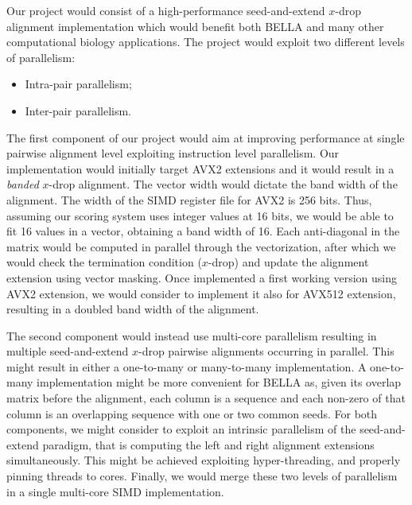 \justify

Our project would consist of a high-performance seed-and-extend $x$-drop alignment implementation which would benefit both BELLA and many other computational biology applications.
The project would exploit two different levels of parallelism:
\begin{itemize}
	\item Intra-pair parallelism;
	\item Inter-pair parallelism.
\end{itemize}

The first component of our project would aim at improving performance at single pairwise alignment level exploiting instruction level parallelism. 	
Our implementation would initially target AVX2 extensions and it would result in a \textit{banded} $x$-drop alignment.
The vector width would dictate the band width of the alignment.
The width of the SIMD register file for AVX2 is 256 bits.
Thus, assuming our scoring system uses integer values at 16 bits, we would be able to fit 16 values in a vector, obtaining a band width of 16. 
Each anti-diagonal in the matrix would be computed in parallel through the vectorization, after which we would check the termination condition ($x$-drop) and update the alignment extension using vector masking. 	
Once implemented a first working version using AVX2 extension, we would consider to implement it also for AVX512 extension, resulting in a doubled band width of the alignment.

The second component would instead use multi-core parallelism resulting in multiple seed-and-extend $x$-drop pairwise alignments occurring in parallel. This might result in either a one-to-many or many-to-many implementation.
A one-to-many implementation might be more convenient for BELLA as, given its overlap matrix before the alignment, each column is a sequence and each non-zero of that column is an overlapping sequence with one or two common seeds.
For both components, we might consider to exploit an intrinsic parallelism of the seed-and-extend paradigm, that is computing the left and right alignment extensions simultaneously. This might be achieved exploiting hyper-threading, and properly pinning threads to cores.
Finally, we would merge these two levels of parallelism in a single multi-core SIMD implementation.

